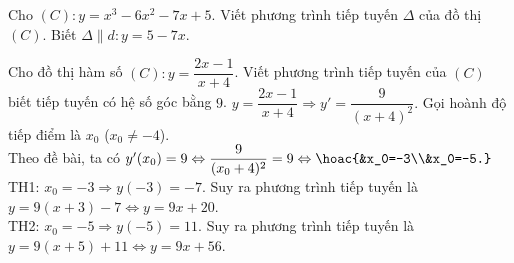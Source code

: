 \begin{bt}%
Cho $(C)\colon y=x^3-6 x^2-7 x+5$. Viết phương trình tiếp tuyến $\Delta$ của đồ thị $(C)$. Biết $\Delta \parallel  d\colon y=5-7 x$.	
\end{bt}

\begin{bt}%

	Cho đồ thị hàm số $(C)\colon y= \dfrac {2x-1}{x+4}$. Viết phương trình tiếp tuyến của $(C)$ biết tiếp tuyến có hệ số góc bằng $9$.
	\loigiai
	{$y= \dfrac {2x-1}{x+4} \Rightarrow y'= \dfrac {9}{(x+4)^2}.$ Gọi hoành độ tiếp điểm là $x_0$ ($x_0\neq -4$).\\
		Theo đề bài, ta có $y'(x_0)=9\Leftrightarrow\dfrac {9}{(x_0+4)^2} =9\Leftrightarrow\hoac{&x_0=-3\\&x_0=-5.}$\\
		TH1: $x_0=-3 \Rightarrow y(-3)=-7$. Suy ra phương trình tiếp tuyến là $y=9(x+3)-7 \Leftrightarrow y=9x+20$.\\
		TH2: $x_0=-5 \Rightarrow y(-5)=11$. Suy ra phương trình tiếp tuyến là $y=9(x+5)+11\Leftrightarrow y=9x+56$.
	}
\end{bt}

